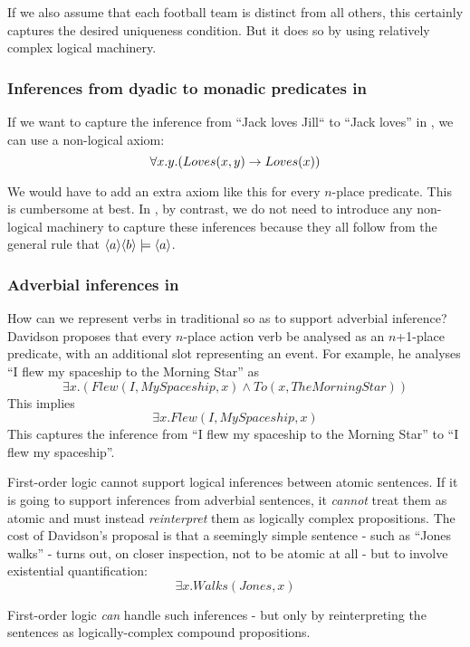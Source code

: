 \NI If we also assume that each football team is distinct from all 
others, this certainly captures the desired uniqueness condition.  But
it does so by using relatively complex logical machinery.



\subsubsection{Inferences from dyadic to monadic predicates in \fol{}}
If we want to capture the inference from ``Jack loves Jill`` to ``Jack
loves'' in \fol{}, we can use a non-logical axiom:
\[
   \forall x. y .( Loves(x,y) \rightarrow Loves(x))
\]

\NI We would have to add an extra  axiom like this for every
$n$-place predicate.  This is cumbersome at best.  In \cathoristic{}, by
contrast, we do not need to introduce any non-logical machinery 
to capture these inferences because they all follow from the general
rule that $\MAY{a} \MAY{b} \models \MAY{a}$.

\subsubsection{Adverbial inferences in \fol{}}

\NI How can we represent verbs in traditional \fol{} so as to
support adverbial inference?  Davidson \cite{davidson2} proposes that
every $n$-place action verb be analysed as an $n$+1-place predicate,
with an additional slot representing an event.  For example, he
analyses ``I flew my spaceship to the Morning Star'' as
\[
\exists x. ( Flew(I, MySpaceship, x) \land To(x, TheMorningStar))
\]
This implies 
\[
\exists x.  Flew(I, MySpaceship, x)
\]
This captures the inference from ``I flew my spaceship to the Morning
Star'' to ``I flew my spaceship''.

First-order logic cannot support logical inferences between atomic
sentences.  If it is going to support inferences from adverbial
sentences, it \emph{cannot} treat them as atomic and must instead
\emph{reinterpret} them as logically complex propositions.  The cost
of Davidson's proposal is that a seemingly simple sentence - such as
``Jones walks'' - turns out, on closer inspection, not to be atomic at
all - but to involve existential quantification:
\[
\exists x.  Walks(Jones, x)
\]

\NI First-order logic \emph{can} handle such inferences - but only by
reinterpreting the sentences as logically-complex compound
propositions.
